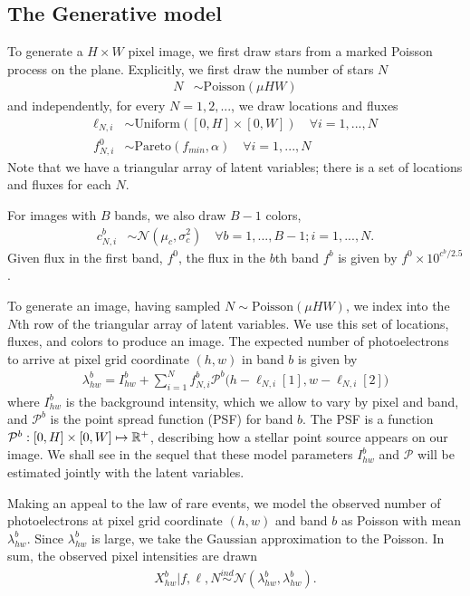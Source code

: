 \subsection{The Generative model}
\label{sec:gen_model}
To generate a $H \times W$ pixel image, we first draw stars from a marked Poisson process
on the plane. Explicitly, we first draw the number of stars $N$
\begin{align}
	N &\sim \text{Poisson}(\mu HW)
\end{align}
and independently, for every $N = 1, 2, ... $, we draw locations and fluxes
\begin{align}
  \ell_{N, i} &\sim \text{Uniform}([0, H] \times [0, W]) \quad \forall i = 1, ..., N \\
  f_{N, i}^{0} & \sim \text{Pareto}(f_{min}, \alpha) \quad \forall i = 1, ..., N
\end{align}
Note that we have a triangular array of latent variables; there is a set of
locations and fluxes for each $N$.

For images with $B$ bands, we also draw $B - 1$ colors,
\begin{align}
  c_{N, i}^{b}  & \sim \mathcal{N}(\mu_c, \sigma^2_c) \quad \forall b = 1, ..., B - 1; i = 1, ..., N.
\end{align}
Given flux in the first band, $f^0$, the flux in the $b$th band $f^b$ is given by
$f^0 \times 10^{c^b / 2.5}$.

To generate an image, having sampled $N\sim \text{Poisson}(\mu HW)$,
we index into the $N$th row of the triangular array of latent variables.
We use this set of locations, fluxes, and colors to produce an image.
The expected number of photoelectrons to arrive at pixel grid
coordinate $(h,w)$ in band $b$ is given by
\begin{align}
  \lambda^b_{hw} = I^{b}_{hw} + \sum_{i = 1}^N f_{N, i}^b \mathcal{P}^b\big(h - \ell_{N, i}[1], w - \ell_{N,i}[2]\big)
  \label{eq:expected_intensity}
\end{align}
where $I^{b}_{hw}$ is the background intensity, which we allow to vary by pixel and band,
and $\mathcal{P}^b$ is the point spread function (PSF) for band $b$. The PSF
is a function $\mathcal{P}^b : [0, H] \times [0, W] \mapsto \mathbb{R}^+$,
describing how a stellar point source appears
on our image. We shall see in the sequel that these model
parameters $I^{b}_{hw}$ and $\mathcal{P}$ will be estimated jointly with
the latent variables.

Making an appeal to the law of rare events, we model the
observed number of photoelectrons at pixel grid coordinate $(h,w)$ and band $b$ as Poisson
with mean $\lambda^b_{hw}$. Since $\lambda^b_{hw}$ is large,
we take the Gaussian approximation to the Poisson.
In sum, the observed pixel intensities are drawn
\begin{align}
  X_{hw}^b | f, \ell, N \overset{ind}{\sim} \mathcal{N}(\lambda^b_{hw}, \lambda^b_{hw}).
\end{align}

